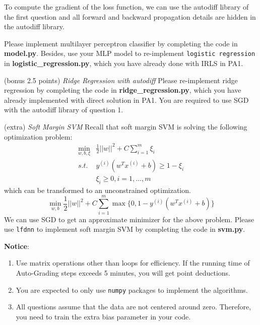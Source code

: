 \documentclass[a4paper, 12pt]{exam}
\begin{document}
\begin{questions}
		To compute the gradient of the loss function, we can use the autodiff library of the first question and all forward and backward propagation details
		are hidden in the autodiff library.

		Please implement multilayer perceptron classifier by completing the code in \textbf{model.py}.
		Besides, use your MLP model to re-implement \texttt{logistic regression} in \linebreak[4] \textbf{logistic\_regression.py}, which you have already done with IRLS in PA1.
		
		\question (bonus 2.5 points) \emph{Ridge Regression with autodiff}
		Please re-implement ridge regression by completing the code in \textbf{ridge\_regression.py}, which you have already implemented with direct solution in PA1.
		You are required to use SGD with the autodiff library of question 1.

		\question (extra) \emph{Soft Margin SVM}
		Recall that soft margin SVM is solving
		the following optimization problem:
		\begin{align*}
		    \min_{w,b,\xi}& \frac{1}{2}||w||^2 + C \sum_{i=1}^m \xi_i \\
		    s.t.\, &y^{(i)} (w^T x^{(i)} + b) \geq 1 -\xi_i \\
		    &\xi_i \geq 0, i=1,\dots, m
		\end{align*}
		which can be transformed to an unconstrained
		optimization.
		\begin{equation*}
		    \min_{w, b} \frac{1}{2}||w||^2  + C\sum_{i=1}^m \max\{0, 1 - y^{(i)} (w^T x^{(i)} + b) \}
		\end{equation*}
		We can use SGD to get an approximate minimizer for the above problem.
		Please use \texttt{lfdnn} to implement soft margin SVM by completing the code in \textbf{svm.py}.		
	\end{questions}
	
	
	\nocite{*}
	\begin{flushleft}
		\textbf{Notice}: \\
		\begin{enumerate}
			\item Use matrix operations other than loops for efficiency. If the running time of Auto-Grading steps exceeds 5 minutes, you will get point deductions.
			\item You are expected to only use \texttt{numpy} packages to implement the algorithms.
			\item All questions assume that the data are not centered around zero. Therefore, you need to train the extra bias parameter in your code.
		\end{enumerate}
	\end{flushleft}
	
\end{document}

